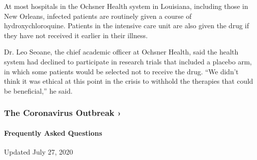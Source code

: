 At most hospitals in the Ochsner Health system in Louisiana, including
those in New Orleans, infected patients are routinely given a course of
hydroxychloroquine. Patients in the intensive care unit are also given
the drug if they have not received it earlier in their illness.

Dr. Leo Seoane, the chief academic officer at Ochsner Health, said the
health system had declined to participate in research trials that
included a placebo arm, in which some patients would be selected not to
receive the drug. ``We didn't think it was ethical at this point in the
crisis to withhold the therapies that could be beneficial,'' he said.

\href{https://www.nytimes3xbfgragh.onion/news-event/coronavirus?action=click\&pgtype=Article\&state=default\&region=MAIN_CONTENT_3\&context=storylines_faq}{}

\hypertarget{the-coronavirus-outbreak-}{%
\subsubsection{The Coronavirus Outbreak
›}\label{the-coronavirus-outbreak-}}

\hypertarget{frequently-asked-questions}{%
\paragraph{Frequently Asked
Questions}\label{frequently-asked-questions}}

Updated July 27, 2020

